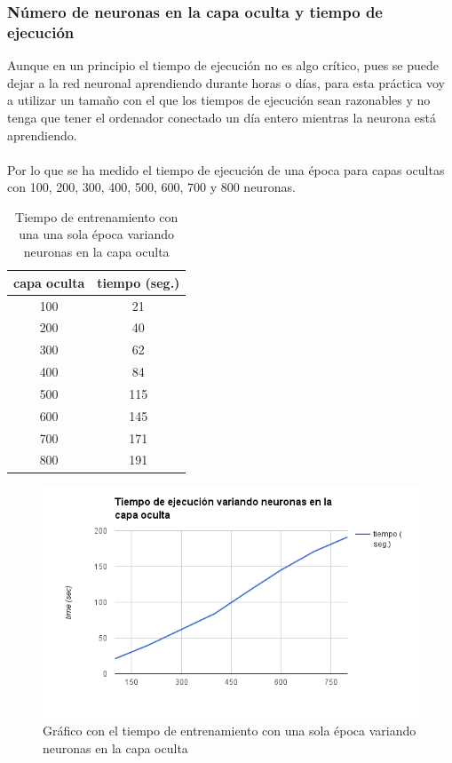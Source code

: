 \subsubsection{Número de neuronas en la capa oculta y tiempo de ejecución}

Aunque en un principio el tiempo de ejecución no es algo crítico, pues se puede dejar a la red neuronal aprendiendo durante horas o días, para esta práctica voy a utilizar un tamaño con el que los tiempos de ejecución sean razonables y no tenga que tener el ordenador conectado un día entero mientras la neurona está aprendiendo.
\\ \\
Por lo que se ha medido el tiempo de ejecución de una época para capas ocultas con 100, 200, 300, 400, 500, 600, 700 y 800 neuronas.
\begin{table}[H]
	\centering
	\caption{Tiempo de entrenamiento con una una sola época variando neuronas en la capa oculta}
	\label{tab:one-epoch-run-time}
	\begin{tabular}{| c | c |}
		\hline
		capa oculta & tiempo (seg.) \\ 
		\hline
		100 & 21 \\
		200 & 40 \\
		300 & 62 \\
		400 & 84 \\
		500 & 115 \\
		600 & 145 \\
		700 & 171 \\
		800 & 191 \\
		\hline
	\end{tabular}
\end{table}

\begin{figure}[H]
\centering
\includegraphics[width=14cm]{img/one-epoch-run-time}
\caption{Gráfico con el tiempo de entrenamiento con una sola época variando neuronas en la capa oculta}
\label{fig:one-epoch-run-time}
\end{figure}

